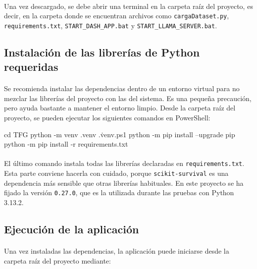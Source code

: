 \paragraph*{}Una vez descargado, se debe abrir una terminal en la carpeta raíz del proyecto, es decir, en la carpeta donde se encuentran archivos como \texttt{cargaDataset.py}, \texttt{requirements.txt}, \texttt{START\_DASH\_APP.bat} y \texttt{START\_LLAMA\_SERVER.bat}.

\subsection{Instalación de las librerías de Python requeridas}

\paragraph*{}Se recomienda instalar las dependencias dentro de un entorno virtual para no mezclar las librerías del proyecto con las del sistema. Es una pequeña precaución, pero ayuda bastante a mantener el entorno limpio. Desde la carpeta raíz del proyecto, se pueden ejecutar los siguientes comandos en PowerShell:

\begin{bloquecomando}
cd TFG
python -m venv .venv
.\.venv\Scripts\Activate.ps1
python -m pip install --upgrade pip
python -m pip install -r requirements.txt
\end{bloquecomando}

\paragraph*{}El último comando instala todas las librerías declaradas en \texttt{requirements.txt}. Esta parte conviene hacerla con cuidado, porque \texttt{scikit-survival} es una dependencia más sensible que otras librerías habituales. En este proyecto se ha fijado la versión \texttt{0.27.0}, que es la utilizada durante las pruebas con Python 3.13.2.

\subsection{Ejecución de la aplicación}

\paragraph*{}Una vez instaladas las dependencias, la aplicación puede iniciarse desde la carpeta raíz del proyecto mediante:

